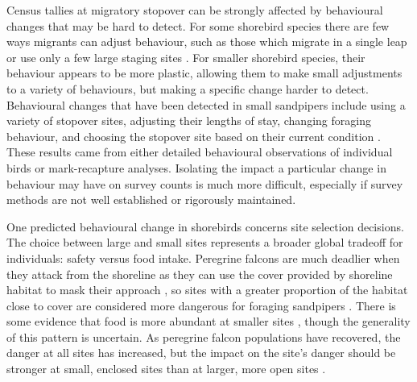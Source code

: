 Census tallies at migratory stopover can be strongly affected by behavioural changes that may be hard to detect. For some shorebird species there are few ways migrants can adjust behaviour, such as those which migrate in a single leap \citep{GillJr.2009} or use only a few large staging sites \citep{Gillings2009b}. For smaller shorebird species, their behaviour appears to be more plastic, allowing them to make small adjustments to a variety of behaviours, but making a specific change harder to detect. Behavioural changes that have been detected in small sandpipers include using a variety of stopover sites, adjusting their lengths of stay, changing foraging behaviour, and choosing the stopover site based on their current condition \citep{Ydenberg2002,Beauchamp2006a,pomeroy_tradeoffs_2006,Dekker2011,Hope2014,Quinn2012a}. These results came from either detailed behavioural observations of individual birds or mark-recapture analyses. Isolating the impact a particular change in behaviour may have on survey counts is much more difficult, especially if survey methods are not well established or rigorously maintained.

One predicted behavioural change in shorebirds concerns site selection decisions. The choice between large and small sites represents a broader global tradeoff for individuals: safety versus food intake. Peregrine falcons are much deadlier when they attack from the shoreline as they can use the cover provided by shoreline habitat to mask their approach \citep{Dekker2011}, so sites with a greater proportion of the habitat close to cover are considered more dangerous for foraging sandpipers \citep{pomeroy_experimental_2006}. There is some evidence that food is more abundant at smaller sites \citep{Pomeroy2008a,Sprague2008a}, though the generality of this pattern is uncertain. As peregrine falcon populations have recovered, the danger at all sites has increased, but the impact on the site's danger should be stronger at small, enclosed sites than at larger, more open sites \citep{Ydenberg2017}. 

